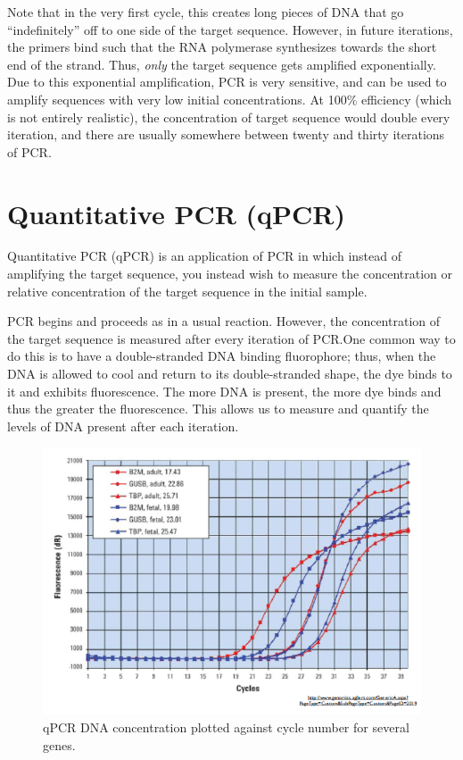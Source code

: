 \documentclass{article}
\begin{document}
Note that in the very first cycle, this creates long pieces of DNA that go ``indefinitely'' off to
one side of the target sequence. However, in future iterations, the primers bind such that the RNA
polymerase synthesizes towards the short end of the strand. Thus, \emph{only} the target sequence
gets amplified exponentially. Due to this exponential amplification, PCR is very sensitive, and can
be used to amplify sequences with very low initial concentrations. At 100\% efficiency (which is not
entirely realistic), the concentration of target sequence would double every iteration, and there
are usually somewhere between twenty and thirty iterations of PCR.\@

\clearpage
\section*{Quantitative PCR (qPCR)}

Quantitative PCR (qPCR) is an application of PCR in which instead of amplifying the target sequence,
you instead wish to measure the concentration or relative concentration of the target sequence in
the initial sample. 

PCR begins and proceeds as in a usual reaction. However, the concentration of the target sequence is
measured after every iteration of PCR.\@ One common way to do this is to have a double-stranded DNA
binding fluorophore; thus, when the DNA is allowed to cool and return to its double-stranded shape,
the dye binds to it and exhibits fluorescence. The more DNA is present, the more dye binds and thus
the greater the fluorescence. This allows us to measure and quantify the levels of DNA present after
each iteration.

\begin{figure}[h!]
    \centering
    \includegraphics[scale=0.5]{images/qpcr.png}
    \caption{
        qPCR DNA concentration plotted against cycle number for several genes.
    }
\end{figure}
\end{document}
